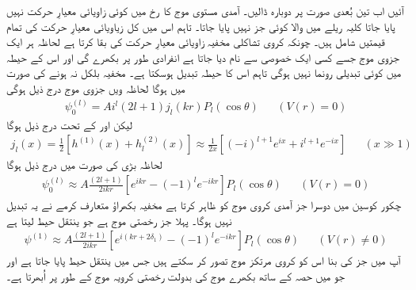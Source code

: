 \documentclass[leqno, b5paper]{khalid-urdu-book}
\begin{document}
آئیں اب تین بُعدی صورت پر دوبارہ ڈالیں۔ آمدی مستوی موج  کا  رخ میں کوئی زاویائی معیارِ حرکت نہیں پایا جاتا کلیہ ریلے میں  والا کوئی جز نہیں پایا جاتا۔ تاہم اس میں کل زیاویائی معیارِ حرکت  کی تمام قیمتیں شامل ہیں۔ چونکہ کروی تشاکلی مخفیہ زاویائی معیارِ حرکت کی بقا کرتا ہے لحاظہ ہر ایک جزوی موج جسے کسی ایک خصوصی  سے نام دیا جاتا ہے انفرادی طور پر بکھرے گی اور اس کے حیطہ میں کوئی تبدیلی رونما نہیں ہوگی تاہم اس کا حیطہ تبدیل ہوسکتا ہے۔ مخفیہ بلکل نہ ہونے کی صورت میں  ہوگا لحاظہ ویں جزوی موج درج ذیل ہوگی 
\begin{align}
	\psi_0^{(l)} = Ai^l(2l+1)j_l(kr)P_l(\cos\theta)&&(V(r)=0)
\end{align}
لیکن  اور  کے تحت درج ذیل ہوگا
\begin{align}
	j_l(x) = \frac{1}{2}\left[h^{(1)}(x)+h_l^{(2)}(x)\right]\approx\frac{1}{2x}\left[(-i)^{l+1}e^{ix}+i^{l+1}e^{-ix}\right]&&(x\gg1)
\end{align}
لحاظہ بڑی  کی صورت میں درج ذیل ہوگا
\begin{align}
	\psi_0^{(l)}\approx A\frac{(2l+1)}{2ikr}\left[e^{ikr}-(-1)^le^{-ikr}\right]P_l(\cos\theta)&&(V(r)=0)
\end{align}
چکور کوسین میں دوسرا جز آمدی کروی موج کو ظاہر کرتا ہے مخفیہ بکھراؤ متعارف کرمے نے یہ تبدیل نہیں ہوگا۔ پہلا جز رخصتی موج ہے جو ینتقل حیط  لیتا ہے
\begin{align}
	\psi^{(1)}\approx A\frac{(2l+1)}{2ikr}\left[e^{i(kr+2\delta_1)}-(-1)^le^{-ikr}\right]P_l(\cos\theta)&&(V(r)\neq0)
\end{align}
آپ  میں  جز کی بنا اس کو کروی مرتکز موج تصور کر سکتے ہیں جس میں  ینتقل حیط پایا جاتا ہے اور جو  میں  حصہ کے ساتھ بکھرے موج کی بدولت رخصتی کرویہ موج کے طور پر اُبھرتا ہے۔
\end{document}
